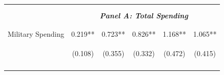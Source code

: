 \documentclass[dv_diss_main.tex]{subfiles}
\begin{document}
\begin{table}[H]
\begin{center}
{\begin{tabular}{lccccc}
    \vspace{-2pt} & \vspace{-2pt} & \vspace{-2pt} & \vspace{-2pt} & \vspace{-2pt} \\\hline
    \vspace{-1.5pt} & \vspace{-1.5pt} & \vspace{-1.5pt} & \vspace{-1.5pt} & \vspace{-1.5pt} \\
    \cmidrule{2-6}
    \vspace{-1.5pt} & \vspace{-1.5pt} & \vspace{-1.5pt} & \vspace{-1.5pt} & \vspace{-1.5pt} \\
    & \multicolumn{5}{c}{\textit{\textbf{Panel A: Total Spending}}} \\ 
    \vspace{-1.5pt} & \vspace{-1.5pt} & \vspace{-1.5pt} & \vspace{-1.5pt} & \vspace{-1.5pt} \\ 
    \cmidrule{2-6}
    \vspace{-1.5pt} & \vspace{-1.5pt} & \vspace{-1.5pt} & \vspace{-1.5pt} & \vspace{-1.5pt}\\
     Military Spending & 0.219** & 0.723** & 0.826** & 1.168** & 1.065** \\
     & \begin{footnotesize}(0.108)\end{footnotesize} & \begin{footnotesize}(0.355)\end{footnotesize} & \begin{footnotesize}(0.332)\end{footnotesize} & \begin{footnotesize}(0.472)\end{footnotesize} & \begin{footnotesize}(0.415)\end{footnotesize} \\
    \vspace{-1.5pt} & \vspace{-1.5pt} & \vspace{-1.5pt} & \vspace{-1.5pt} & \vspace{-1.5pt} \\
    

\end{tabular}}
\end{center}
\end{table}
\end{document}
